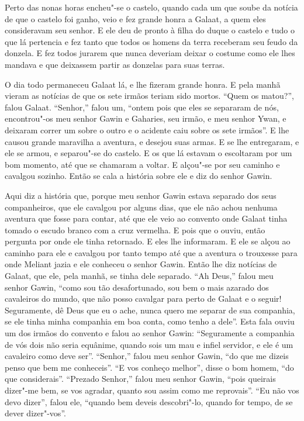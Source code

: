 Perto das nonas horas encheu"-se o castelo, quando cada um que soube da notícia
de que o castelo foi ganho, veio e fez grande honra a Galaat, a quem eles
consideravam seu senhor. E ele deu de pronto à filha do duque o castelo e tudo
o que lá pertencia e fez tanto que todos os homens da terra receberam seu feudo
da donzela. E fez todos jurarem que nunca deveriam deixar o costume como ele
lhes mandava e que deixassem partir as donzelas para suas terras.

O dia todo permaneceu Galaat lá, e lhe fizeram grande honra. E pela manhã vieram
as notícias de que os sete irmãos teriam sido mortos. “Quem os matou?”, falou
Galaat. “Senhor,” falou um, “ontem pois que eles se separaram de nós,
encontrou"-os meu senhor Gawin e Gaharies, seu irmão, e meu senhor Ywan, e
deixaram correr um sobre o outro e o acidente caiu sobre os sete irmãos''. E lhe
causou grande maravilha a aventura, e desejou suas armas. E se lhe entregaram,
e ele se armou, e separou"-se do castelo. E os que lá estavam o escoltaram por
um bom momento, até que se chamaram a voltar. E alçou"-se por seu caminho e
cavalgou sozinho. Então se cala a história sobre ele e diz do senhor Gawin. 

Aqui diz a história que, porque meu senhor Gawin  estava separado dos
seus companheiros, que ele cavalgou por alguns dias, que ele não achou nenhuma
aventura que fosse para contar, até que ele veio ao convento onde Galaat tinha
tomado o escudo branco com a cruz vermelha. E pois que o ouviu, então pergunta
por onde ele tinha retornado. E eles lhe informaram. E ele se alçou ao caminho
para ele e cavalgou por tanto tempo até que a aventura o trouxesse para onde
Meliant jazia e ele conheceu o senhor Gawin. Então lhe diz notícias de Galaat,
que ele, pela manhã, se tinha dele separado. “Ah Deus,” falou meu senhor Gawin,
``como sou tão desafortunado, sou bem o mais azarado dos cavaleiros do
mundo, que não posso cavalgar para perto de Galaat e o seguir! Seguramente, dê
Deus que eu o ache, nunca quero me separar de sua companhia, se ele tinha minha
companhia em boa conta, como tenho a dele”. Esta fala ouviu um dos irmãos do
convento e falou ao senhor Gawin: “Seguramente a companhia de vós dois não
seria equânime, quando sois um mau e infiel servidor,  e ele é um cavaleiro
como deve ser”.  “Senhor,” falou meu senhor Gawin,  “do que me dizeis
penso que bem me conheceis”. “E vos conheço melhor”, disse o bom homem, “do que
considerais”. “Prezado Senhor,” falou meu senhor Gawin,  “pois queirais
dizer"-me bem, se vos agradar, quanto sou assim como me reprovais”. “Eu não vos
devo dizer”, falou ele, “quando bem deveis descobri"-lo, quando for tempo, de se
dever dizer"-vos”. 


